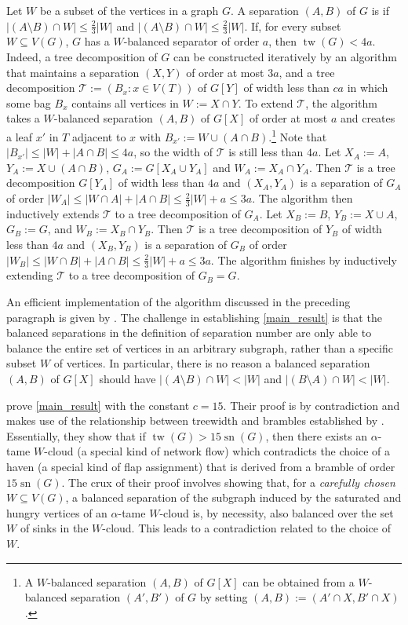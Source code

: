 \documentclass{patmorin}
\DeclareMathOperator{\sep}{sn}
\DeclareMathOperator{\tw}{tw}
\begin{document}
Let $W$ be a subset of the vertices in a graph $G$.  A separation $(A,B)$ of $G$ is  if $|(A\setminus B)\cap W|\le \tfrac{2}{3}|W|$ and $|(A\setminus B)\cap W|\le \tfrac{2}{3}|W|$.  If, for every subset $W\subseteq V(G)$, $G$ has a $W$-balanced separator of order $a$, then  $\tw(G)<4a$.  Indeed, a tree decomposition of $G$ can be constructed iteratively by an algorithm that maintains a separation $(X,Y)$ of order at most $3a$, and a tree decomposition $\mathcal{T}:=(B_x:x\in V(T))$ of $G[Y]$ of width less than $ca$ in which some bag $B_x$ contains all vertices in $W:=X\cap Y$.  To extend $\mathcal{T}$, the algorithm takes a $W$-balanced separation $(A,B)$ of $G[X]$ of order at most $a$ and creates a leaf $x'$ in $T$ adjacent to $x$ with $B_{x'}:=W\cup (A\cap B)$.\footnote{A $W$-balanced separation $(A,B)$ of $G[X]$ can be obtained from a $W$-balanced separation $(A',B')$ of $G$ by setting $(A,B):=(A'\cap X,B'\cap X)$.}  Note that $|B_{x'}|\le |W|+|A\cap B|\le 4a$, so the width of $\mathcal{T}$ is still less than $4a$.
Let $X_A:=A$, $Y_A:=X\cup(A\cap B)$, $G_A:=G[X_A\cup Y_A]$ and $W_A:=X_A\cap Y_A$.  Then $\mathcal{T}$ is a tree decomposition $G[Y_A]$ of width less than $4a$ and $(X_A,Y_A)$ is a separation of $G_A$ of order $|W_A|\le|W\cap A|+|A\cap B|\le \tfrac{2}{3}|W|+a\le 3a$. The algorithm then inductively extends $\mathcal{T}$ to a tree decomposition of $G_A$.  Let $X_B:=B$, $Y_B:=X\cup A$, $G_B:=G$, and $W_B:=X_B\cap Y_B$.  Then $\mathcal{T}$ is a tree decomposition of $Y_B$ of width less than $4a$ and $(X_B,Y_B)$ is a separation of $G_B$ of order $|W_B|\le |W\cap B|+|A\cap B|\le\tfrac{2}{3}|W|+a\le 3a$.  The algorithm finishes by inductively extending $\mathcal{T}$ to a tree decomposition of $G_B=G$.

An efficient implementation of the algorithm discussed in the preceding paragraph is given by \citet[Fact~2.7]{reed:tree}.  The challenge in establishing \cref{main_result} is that the balanced separations in the definition of separation number are only able to balance the entire set of vertices in an arbitrary subgraph, rather than a specific subset $W$ of vertices.  In particular, there is no reason a balanced separation $(A,B)$ of $G[X]$ should have $|(A\setminus B)\cap W|<|W|$ and $|(B\setminus A)\cap W|<|W|$.

\citet{dvorak.norin:treewidth} prove \cref{main_result} with the constant $c=15$. Their proof is by contradiction and makes use of the relationship between treewidth and brambles established by \citet{seymour.thomas:graph}.  Essentially, they show that if $\tw(G)>15\sep(G)$, then there exists an $\alpha$-tame $W$-cloud (a special kind of network flow) which contradicts the choice of a haven (a special kind of flap assignment) that is derived from a bramble of order $15\sep(G)$.  The crux of their proof \cite[Proof of Lemma~7]{dvorak.norin:treewidth} involves showing that, for a \emph{carefully chosen} $W\subseteq V(G)$, a balanced separation of the subgraph induced by the saturated and hungry vertices of an $\alpha$-tame $W$-cloud is, by necessity, also balanced over the set $W$ of sinks in the $W$-cloud. This leads to a contradiction related to the choice of $W$.
\end{document}
